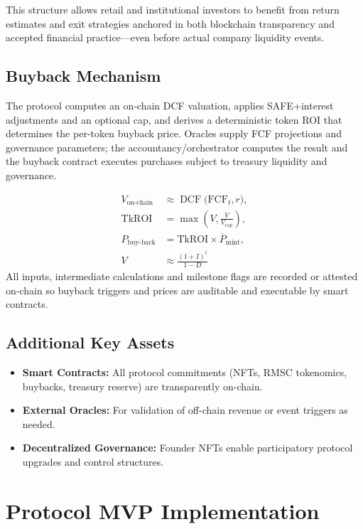 \documentclass[conference]{IEEEtran}
\begin{document}
This structure allows retail and institutional investors to benefit from return estimates and exit strategies anchored in both blockchain transparency and accepted financial practice—even before actual company liquidity events.

\subsection{Buyback Mechanism}
The protocol computes an on‑chain DCF valuation, applies SAFE+interest adjustments and an optional cap, and derives a deterministic token ROI that determines the per‑token buyback price. Oracles supply FCF projections and governance parameters; the accountancy/orchestrator computes the result and the buyback contract executes purchases subject to treasury liquidity and governance.


\begin{equation}
\begin{aligned}
V_{\text{on-chain}}
  &\approx \operatorname{DCF}\!\big(\mathrm{FCF}_t, r\big),\\[2pt]
\mathrm{TkROI}
  &= \max\!\left( V, \frac{V}{V_{\text{cap}}} \right),\\[2pt]
P_{\text{buy-back}}
  &= \mathrm{TkROI} \times \overline{P}_{\text{mint}},\\[4pt]
V &\approx \frac{(1+I)^{t}}{1-D}
\end{aligned}
\end{equation}
All inputs, intermediate calculations and milestone flags are recorded or attested on‑chain so buyback triggers and prices are auditable and executable by smart contracts.


\subsection{Additional Key Assets}
\begin{itemize}
    \item \textbf{Smart Contracts:} All protocol commitments (NFTs, RMSC tokenomics, buybacks, treasury reserve) are transparently on-chain.
    \item \textbf{External Oracles:} For validation of off-chain revenue or event triggers as needed.
    \item \textbf{Decentralized Governance:} Founder NFTs enable participatory protocol upgrades and control structures.
\end{itemize}

\section{Protocol MVP Implementation}
\end{document}
